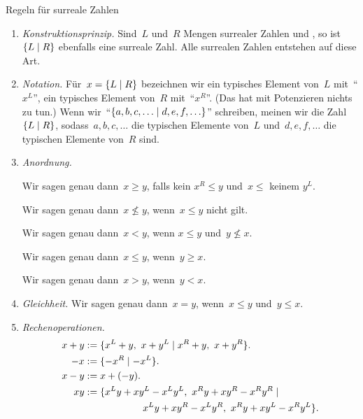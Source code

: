 \documentclass{zirkelblatt}
\begin{document}
\begin{block}{Regeln für surreale Zahlen}
\renewcommand{\labelenumi}{\arabic{enumi}.}
\begin{enumerate}
\item \emph{Konstruktionsprinzip.}
Sind~$L$ und~$R$ Mengen surrealer Zahlen und , so ist~$\{ L \mathrel{|} R \}$ ebenfalls eine surreale
Zahl. Alle surrealen Zahlen entstehen auf diese Art.

\item \emph{Notation.}
Für~$x = \{ L \mathrel{|} R \}$ bezeichnen wir ein typisches Element von~$L$
mit~"`$x^L$"', ein typisches Element von~$R$ mit~"`$x^R$"'. (Das hat mit
Potenzieren nichts zu tun.) Wenn
wir~"`$\{ a,b,c,\ldots \mathrel{|} d,e,f,\ldots \}$"' schreiben, meinen wir die
Zahl~$\{ L \mathrel{|} R \}$, sodass~$a,b,c,\ldots$ die typischen Elemente von~$L$
und~$d,e,f,\ldots$ die typischen Elemente von~$R$ sind.

\item \emph{Anordnung.}

Wir sagen genau dann~$x \geq y$, falls kein $x^R \leq y$ und~$x \leq$
keinem $y^L$.

Wir sagen genau dann~$x \not\leq y$, wenn~$x \leq y$ nicht gilt.

Wir sagen genau dann~$x < y$, wenn $x \leq y$ und~$y \not\leq x$.

Wir sagen genau dann~$x \leq y$, wenn~$y \geq x$.

Wir sagen genau dann~$x > y$, wenn~$y < x$.

\item \emph{Gleichheit.}
Wir sagen genau dann~$x = y$, wenn~$x \leq y$ und~$y \leq x$.

\item \emph{Rechenoperationen.}
\begin{align*}
  x + y &:= \{ x^L + y,\ x + y^L \mathrel{|} x^R + y,\ x + y^R \}. \\
  -x &:= \{ -x^R \mathrel{|} -x^L \}. \\
  x - y &:= x + (-y). \\
  xy &:= \{ x^Ly + xy^L - x^Ly^L,\ x^Ry + xy^R - x^Ry^R \mathrel{|} \\&\qquad\qquad\qquad x^Ly + xy^R -
x^Ly^R,\ x^Ry + xy^L - x^Ry^L \}.
\end{align*}
\end{enumerate}
\end{block}
\end{document}
